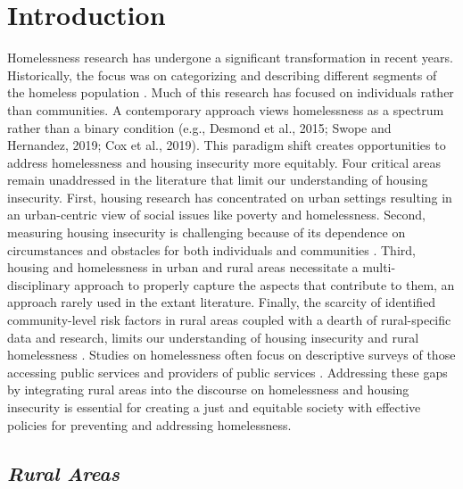 \chapter{Introduction} 

Homelessness research has undergone a significant transformation in recent years. Historically, the focus was on categorizing and describing different segments of the homeless population \citep{lee_homelessness_2021}. Much of this research has focused on individuals rather than communities. A contemporary approach views homelessness as a spectrum rather than a binary condition (e.g., Desmond et al., 2015; Swope and Hernandez, 2019; Cox et al., 2019). This paradigm shift creates opportunities to address homelessness and housing insecurity more equitably. Four critical areas remain unaddressed in the literature that limit our understanding of housing insecurity. First, housing research has concentrated on urban settings resulting in an urban-centric view of social issues like poverty and homelessness. Second, measuring housing insecurity is challenging because of its dependence on circumstances and obstacles for both individuals and communities \citep{leifheit_building_2022}. Third, housing and homelessness in urban and rural areas necessitate a multi-disciplinary approach to properly capture the aspects that contribute to them, an approach rarely used in the extant literature.  Finally, the scarcity of identified community-level risk factors in rural areas coupled with a dearth of rural-specific data and research, limits our understanding of housing insecurity and rural homelessness \citep{gleason_using_2021}. Studies on homelessness often focus on descriptive surveys of those accessing public services and providers of public services \citep{robertson_rural_2007}. Addressing these gaps by integrating rural areas into the discourse on homelessness and housing insecurity is essential for creating a just and equitable society with effective policies for preventing and addressing homelessness\citep{oregan_how_2021}.

\section{\textit{Rural Areas}}

